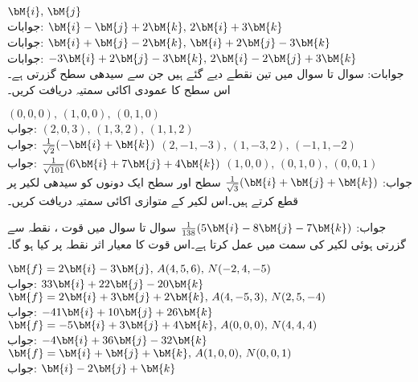 \quad
$\bM{i},\,\bM{j}$\\
جوابات:
\quad
$\bM{i}-\bM{j}+2\bM{k},\, 2\bM{i}+3\bM{k}$\\
جوابات:
\quad
$\bM{i}+\bM{j}-2\bM{k},\,\bM{i}+2\bM{j}-3\bM{k}$\\
جوابات:
\quad
$-3\bM{i}+2\bM{j}-3\bM{k},\,2\bM{i}-2\bM{j}+3\bM{k}$\\
جوابات:
سوال  تا سوال  میں تین نقطے دیے گئے ہیں جن سے سیدھی سطح گزرتی ہے۔اس سطح کا عمودی اکائی سمتیہ دریافت کریں۔

\quad
$(0,0,0),\, (1,0,0),\, (0,1,0)$\\
جواب:
\quad
$(2,0,3),\, (1,3,2),\, (1,1,2)$\\
جواب:
$\tfrac{1}{\sqrt{2}}(-\bM{i}+\bM{k})$
\quad
$(2,-1,-3),\, (1,-3,2),\, (-1,1,-2)$\\
جواب:
$\tfrac{1}{\sqrt{101}}(6\bM{i}+7\bM{j}+4\bM{k})$
\quad
$(1,0,0),\, (0,1,0),\, (0,0,1)$\\
جواب:
$\tfrac{1}{\sqrt{3}}(\bM{i}+\bM{j}+\bM{k})$
سطح  اور سطح  ایک دونوں کو سیدھی لکیر پر قطع کرتے ہیں۔اس لکیر کے متوازی اکائی سمتیہ دریافت کریں۔

جواب:
$\tfrac{1}{138}(5\bM{i}-8\bM{j}-7\bM{k})$
سوال  تا سوال  میں قوت ، نقطہ  سے گزرتی ہوئی لکیر کی سمت میں عمل کرتا ہے۔اس قوت کا معیار اثر   نقطہ  پر کیا ہو گا۔

 \quad
$\bM{f}=2\bM{i}-3\bM{j},\, A(4,5,6),\, N(-2,4,-5)$\\
جواب:
$33\bM{i}+22\bM{j}-20\bM{k}$
\quad
$\bM{f}=2\bM{i}+3\bM{j}+2\bM{k},\, A(4,-5,3),\, N(2,5,-4)$\\
جواب:
$-41\bM{i}+10\bM{j}+26\bM{k}$
\quad
$\bM{f}=-5\bM{i}+3\bM{j}+4\bM{k},\, A(0,0,0),\, N(4,4,4)$\\
جواب:
$-4\bM{i}+36\bM{j}-32\bM{k}$
\quad
$\bM{f}=\bM{i}+\bM{j}+\bM{k},\, A(1,0,0),\, N(0,0,1)$\\
جواب:
$\bM{i}-2\bM{j}+\bM{k}$


